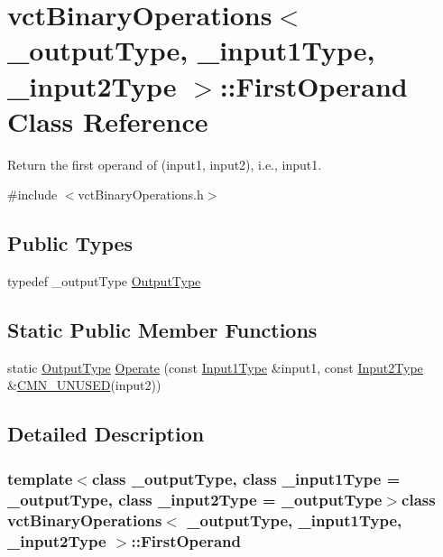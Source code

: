 \hypertarget{classvct_binary_operations_1_1_first_operand}{}\section{vct\+Binary\+Operations$<$ \+\_\+output\+Type, \+\_\+input1\+Type, \+\_\+input2\+Type $>$\+:\+:First\+Operand Class Reference}
\label{classvct_binary_operations_1_1_first_operand}


Return the first operand of (input1, input2), i.\+e., input1.  




{\ttfamily \#include $<$vct\+Binary\+Operations.\+h$>$}

\subsection*{Public Types}
\begin{DoxyCompactItemize}
\item 
typedef \+\_\+output\+Type \hyperlink{classvct_binary_operations_1_1_first_operand_a236847584897a5c19908da9440b730f2}{Output\+Type}
\end{DoxyCompactItemize}
\subsection*{Static Public Member Functions}
\begin{DoxyCompactItemize}
\item 
static \hyperlink{classvct_binary_operations_1_1_first_operand_a236847584897a5c19908da9440b730f2}{Output\+Type} \hyperlink{classvct_binary_operations_1_1_first_operand_aa777aaab3df319d47dcbc67c95d4d5e5}{Operate} (const \hyperlink{classvct_binary_operations_a5e56a66a012d6a28c539a08a0021c45e}{Input1\+Type} \&input1, const \hyperlink{classvct_binary_operations_a929119af557a04a16b4d854981e49e1b}{Input2\+Type} \&\hyperlink{cmn_portability_8h_a021894e2626935fa2305434b1e893ff6}{C\+M\+N\+\_\+\+U\+N\+U\+S\+E\+D}(input2))
\end{DoxyCompactItemize}


\subsection{Detailed Description}
\subsubsection*{template$<$class \+\_\+output\+Type, class \+\_\+input1\+Type = \+\_\+output\+Type, class \+\_\+input2\+Type = \+\_\+output\+Type$>$class vct\+Binary\+Operations$<$ \+\_\+output\+Type, \+\_\+input1\+Type, \+\_\+input2\+Type $>$\+::\+First\+Operand}


